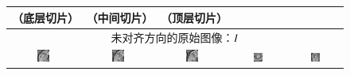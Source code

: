 \renewcommand{\captiontitle}{健康受试者的分割结果}
\begin{figure}
\begin{center}

\setlength{\tabcolsep}{1pt}

\begin{tabular}{ccccc}

\toprule
\SA{}（底层切片） & \SA{} （中间切片） & \SA{}（顶层切片） & \HLA{} & \VLA{} \\
\midrule

\multicolumn{5}{c}{未对齐方向的原始图像：$I$} \\

\includegraphics[width=0.19\textwidth]{./data/representative-results/control/HCMNet_2600035/00_SAX/BASE/0.png} &
\includegraphics[width=0.19\textwidth]{./data/representative-results/control/HCMNet_2600035/00_SAX/MID/0.png} &
\includegraphics[width=0.19\textwidth]{./data/representative-results/control/HCMNet_2600035/00_SAX/APEX/0.png} &
\includegraphics[width=0.19\textwidth]{./data/representative-results/control/HCMNet_1700012/01_HLA/00/0.png} &
\includegraphics[width=0.19\textwidth]{./data/representative-results/control/HCMNet_1700012/02_VLA/00/0.png} \\


\end{tabular}
\end{center}
\end{figure}
